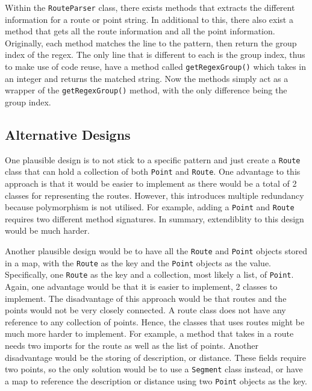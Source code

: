 \documentclass[a4paper, 12pt, titlepage]{article}
\newcommand{\code}[1]{\small\texttt{#1}\normalsize}
\begin{document}
Within the \code{RouteParser} class, there exists methods that extracts the
different information for a route or point string. In additional to this, there
also exist a method that gets all the route information and all the point
information. Originally, each method matches the line to the pattern, then
return the group index of the regex. The only line that is different to each is
the group index, thus to make use of code reuse, have a method called
\code{getRegexGroup()} which takes in an integer and returns the matched
string. Now the methods simply act as a wrapper of the \code{getRegexGroup()}
method, with the only difference being the group index.


\subsection{Alternative Designs}

One plausible design is to not stick to a specific pattern and just create a
\code{Route} class that can hold a collection of both \code{Point} and
\code{Route}. One advantage to this approach is that it would be easier to
implement as there would be a total of 2 classes for representing the routes.
However, this introduces multiple redundancy because polymorphism is not
utilised. For example, adding a \code{Point} and \code{Route} requires two
different method signatures. In summary, extendiblity to this design would be
much harder.

Another plausible design would be to have all the \code{Route} and \code{Point}
objects stored in a map, with the \code{Route} as the key and the \code{Point}
objects as the value. Specifically, one \code{Route} as the key and a
collection, most likely a list, of \code{Point}. Again, one advantage would be
that it is easier to implement, 2 classes to implement. The disadvantage of
this approach would be that routes and the points would not be very closely
connected. A route class does not have any reference to any collection of
points. Hence, the classes that uses routes might be much more harder to
implement. For example, a method that takes in a route needs two imports for
the route as well as the list of points. Another disadvantage would be the
storing of description, or distance. These fields require two points, so the
only solution would be to use a \code{Segment} class instead, or have a map to
reference the description or distance using two \code{Point} objects as the
key.
\end{document}
